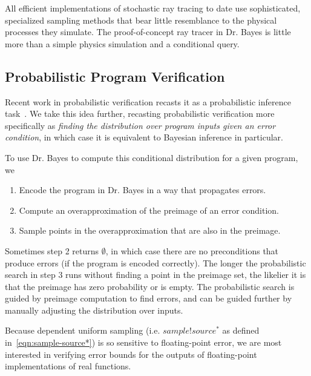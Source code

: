 All efficient implementations of stochastic ray tracing to date use sophisticated, specialized sampling methods that bear little resemblance to the physical processes they simulate.
The proof-of-concept ray tracer in Dr. Bayes is little more than a simple physics simulation and a conditional query.


\subsection{Probabilistic Program Verification}
\label{sec:probabilistic-verification}

Recent work in probabilistic verification recasts it as a probabilistic inference task~\cite{cit:gulwani-2007popl-prob-verify}.
We take this idea further, recasting probabilistic verification more specifically as \emph{finding the distribution over program inputs given an error condition}, in which case it is equivalent to Bayesian inference in particular.

To use Dr. Bayes to compute this conditional distribution for a given program, we
\begin{enumerate}
	\item Encode the program in Dr. Bayes in a way that propagates errors.
	\item Compute an overapproximation of the preimage of an error condition.
	\item Sample points in the overapproximation that are also in the preimage.
\end{enumerate}
Sometimes step 2 returns $\emptyset$, in which case there are no preconditions that produce errors (if the program is encoded correctly).
The longer the probabilistic search in step 3 runs without finding a point in the preimage set, the likelier it is that the preimage has zero probability or is empty.
The probabilistic search is guided by preimage computation to find errors, and can be guided further by manually adjusting the distribution over inputs.

Because dependent uniform sampling (i.e. $sample!source^*$ as defined in~\eqref{eqn:sample-source*}) is so sensitive to floating-point error, we are most interested in verifying error bounds for the outputs of floating-point implementations of real functions.

